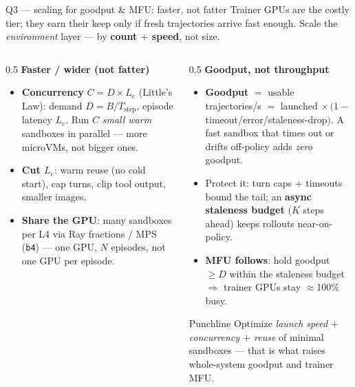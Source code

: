 \documentclass[aspectratio=169]{beamer}
\begin{document}
\begin{frame}{Q3 --- scaling for goodput \& MFU: faster, not fatter}
  \footnotesize Trainer GPUs are the costly tier; they earn their keep only if fresh trajectories arrive
  fast enough. Scale the \emph{environment} layer --- by \textbf{count $+$ speed}, not size.
  \begin{columns}[T]
    \begin{column}{0.5\textwidth}
      \textbf{Faster / wider (not fatter)}
      \begin{itemize}\scriptsize\setlength\itemsep{0.12em}
        \item \textbf{Concurrency} $C = D \times L_e$ (Little's Law): demand $D = B / T_{\text{step}}$,
          episode latency $L_e$. Run $C$ \emph{small warm} sandboxes in parallel --- more microVMs, not bigger ones.
        \item \textbf{Cut $L_e$}: warm reuse (no cold start), cap turns, clip tool output, smaller images.
        \item \textbf{Share the GPU}: many sandboxes per L4 via Ray fractions / MPS (\texttt{b4}) --- one
          GPU, $N$ episodes, not one GPU per episode.
      \end{itemize}
    \end{column}
    \begin{column}{0.5\textwidth}
      \textbf{Goodput, not throughput}
      \begin{itemize}\scriptsize\setlength\itemsep{0.12em}
        \item \textbf{Goodput} $=$ usable trajectories/s $=$ launched $\times\,(1 -$
          timeout/error/staleness-drop$)$. A fast sandbox that times out or drifts off-policy adds
          \emph{zero} goodput.
        \item Protect it: turn caps $+$ timeouts bound the tail; an \textbf{async staleness budget}
          ($K$ steps ahead) keeps rollouts near-on-policy.
        \item \textbf{MFU follows}: hold goodput $\ge D$ within the staleness budget $\Rightarrow$
          trainer GPUs stay $\approx$100\% busy.
      \end{itemize}
      \begin{block}{Punchline}
        \scriptsize Optimize \emph{launch speed $+$ concurrency $+$ reuse} of minimal sandboxes ---
        that is what raises whole-system goodput and trainer MFU.
      \end{block}
    \end{column}
  \end{columns}
\end{frame}
\end{document}
